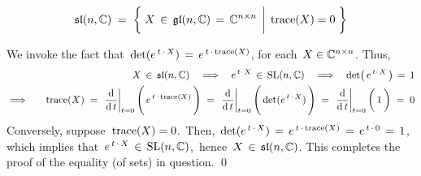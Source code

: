 \vskip 0.2cm
\begin{proposition}
\label{SetTheoreticCharacterizationOfslTwoC}
\mbox{}
\vskip -0.1cm
\begin{equation*}
\mathfrak{sl}(n,\C)
\; = \;
	\left\{\;
		X \,\in\, \mathfrak{gl}(n,\C) \,=\, \C^{n \times n}
		\;\left\vert\;\,
			\textnormal{trace}(X) = \overset{{\color{white}1}}{0}
			\right.
		\,\right\}
\end{equation*}
\end{proposition}
\proof
We invoke the fact that \,$\det(e^{\,t\,\cdot\,X}) \,=\, e^{\,t\,\cdot\,\textnormal{trace}(X)}$,
for each \,$X \in \mathbb{C}^{n \times n}$.
Thus,
\begin{eqnarray*}
&&
	X \,\in\, \mathfrak{sl}(n,\C)
	\quad\Longrightarrow\quad
	e^{\,t\cdot\,X} \,\in\, \textnormal{SL}(n,\C)
	\quad\Longrightarrow\quad
	\det\!\left(\,e^{\,t\cdot\,X}\,\right) \,=\, 1
\\
& \Longrightarrow\quad &
	\textnormal{trace}(X)
	\; = \;
		\left.\dfrac{\d}{\d\,t}\right\vert_{t=0}\left(\,\overset{{\color{white}1}}{e^{\,t\,\cdot\,\textnormal{trace}(X)}}\,\right)
	\; = \;
		\left.\dfrac{\d}{\d\,t}\right\vert_{t=0}\left(\,\overset{{\color{white}1}}{\det(e^{\,t\,\cdot\,X})}\,\right)
	\; = \;
		\left.\dfrac{\d}{\d\,t}\right\vert_{t=0}\left(\,\overset{{\color{white}1}}{1}\,\right)
	\; = \;
		0
\end{eqnarray*}
Conversely, suppose \,$\textnormal{trace}(X) = 0$.\,
Then, \,$\det(e^{\,t\,\cdot\,X}) \,=\, e^{\,t\,\cdot\,\textnormal{trace}(X)} \,=\, e^{\,t\,\cdot\,0} \,=\, 1$,\,
which implies that \,$e^{\,t\,\cdot\,X} \,\in\, \textnormal{SL}(n,\mathbb{C})$,\, hence \,$X \,\in\, \mathfrak{sl}(n,\mathbb{C})$.
This completes the proof of the equality (of sets) in question.
\qed

